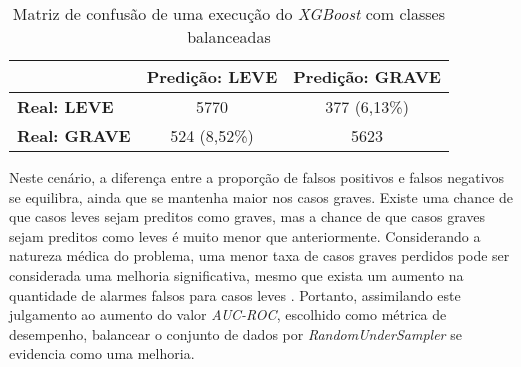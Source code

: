 \begin{table}[H]
  \footnotesize
  \centering
  \centering
  \begin{tabular}{l|c|c|}
    \cline{2-3}
    \textbf{}                         & \multicolumn{1}{l|}{\textbf{Predição: LEVE}} & \multicolumn{1}{l|}{\textbf{Predição: GRAVE}} \\ \hline
    \multicolumn{1}{|l|}{\textbf{Real: LEVE}}  & 5770                                       & 377 (6,13\%)                                           \\ \hline
    \multicolumn{1}{|l|}{\textbf{Real: GRAVE}} & 524 (8,52\%)                                         & 5623                                          \\ \hline   
  \end{tabular}
  \caption{Matriz de confusão de uma execução do \textit{XGBoost} com classes balanceadas}
  \label{tab:matriz-confusao-xgboost-undersample}
\end{table}

Neste cenário, a diferença entre a proporção de falsos positivos e falsos negativos se equilibra, ainda que se mantenha maior nos casos graves. Existe uma chance de que casos leves sejam preditos como graves, mas a chance de que casos graves sejam preditos como leves é muito menor que anteriormente. Considerando a natureza médica do problema, uma menor taxa de casos graves perdidos pode ser considerada uma melhoria significativa, mesmo que exista um aumento na quantidade de alarmes falsos para casos leves \cite{medical-ai-measure}. Portanto, assimilando este julgamento ao aumento do valor \textit{AUC-ROC}, escolhido como métrica de desempenho, balancear o conjunto de dados por \textit{RandomUnderSampler} se evidencia como uma melhoria.
